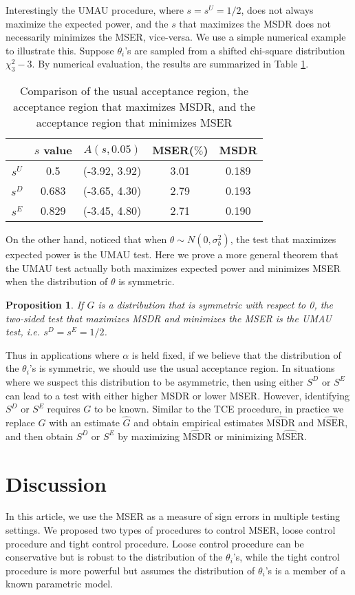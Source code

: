\documentclass[11pt]{article}
\newtheorem{proposition}{Proposition}[section]
\begin{document}
Interestingly the UMAU procedure, where $s=  s^U = 1/2$, does not always maximize the expected power, and the $s$ that maximizes the MSDR does not necessarily minimizes the MSER, vice-versa. We use a simple numerical example to illustrate this. Suppose $\theta_i$'s are sampled from a shifted chi-square distribution $\chi^2_3 - 3$. By numerical evaluation, the results are summarized in Table \ref{ex:dif}.
	\begin{table}[!h] \centering
		\begin{tabular}{|c|c|c|c|c|}
			\hline  & $s$ value & $A(s,0.05)$ & MSER($\%$) & MSDR \\ 
			\hline $s^U$ & 0.5 & (-3.92, 3.92) & 3.01 & 0.189 \\ 
			\hline $s^D$ & 0.683 & (-3.65, 4.30) & 2.79 & 0.193 \\ 
			\hline $s^E$ & 0.829 & (-3.45, 4.80) & 2.71 & 0.190  \\ 
			\hline 
		\end{tabular} 
		\caption{Comparison of the usual acceptance region, the acceptance region that maximizes MSDR, and the acceptance region that minimizes MSER}
		\label{ex:dif}
	\end{table}
	

On the other hand, \citet{storey2007optimal} noticed that when $\theta \sim N(0, \sigma_b^2)$, the test that maximizes expected power is the UMAU test. Here we prove a more general theorem that the UMAU test actually both maximizes expected power and minimizes MSER when the distribution of $\theta$ is symmetric.
\begin{proposition}
	If $G$ is a distribution that is symmetric with respect to 0, the two-sided test that maximizes MSDR and minimizes the MSER is the UMAU test, i.e. $s^D = s^E = 1/2$. 
	\label{theorem:mser}
\end{proposition}
Thus in applications where $\alpha$ is held fixed, if we believe that the distribution of the $\theta_i$'s is symmetric, we should use the usual acceptance region. In situations where we suspect this distribution to be asymmetric, then using either $S^D$ or $S^E$ can lead to a test with either higher MSDR or lower MSER. However, identifying $S^D$ or $S^E$ requires $G$ to be known. Similar to the TCE procedure, in practice we replace $G$ with an estimate $\hat G$ and obtain empirical estimates $\widehat{\text{MSDR}}$  and $\widehat{ \text{MSER}}$, and then obtain $S^D$ or $S^E$ by maximizing $\widehat{ \text{MSDR}}$ or minimizing $\widehat{ \text{MSER}}$.

\section{Discussion}
In this article, we use the MSER as a measure of sign errors in multiple testing settings. We proposed two types of procedures to control MSER, loose control procedure and tight control procedure. Loose control procedure can be  conservative but is robust to the distribution of the 
$\theta_i$'s, while the tight control  procedure is more  powerful but assumes the distribution of $\theta_i$'s is a member of a known parametric model.
\end{document}
